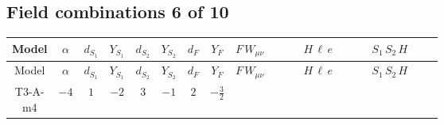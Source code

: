 \documentclass[8pt]{article}
\begin{document}
\begin{landscape}
\subsection*{Field combinations 6 of 10}
\begin{longtable}{@{}cccccccc >{\raggedright\arraybackslash}p{0.21\linewidth} >{\raggedright\arraybackslash}p{0.21\linewidth} >{\raggedright\arraybackslash}p{0.21\linewidth}@{}}
\toprule
Model & $\alpha$ & $d_{S_1}$ & $Y_{S_1}$ & $d_{S_2}$ & $Y_{S_2}$ & $d_F$ & $Y_F$ & $F\,W_{\mu\nu}$ & $H\,\ell\,e$ & $S_1\,S_2\,H$ \\
\midrule
\endfirsthead
\toprule
Model & $\alpha$ & $d_{S_1}$ & $Y_{S_1}$ & $d_{S_2}$ & $Y_{S_2}$ & $d_F$ & $Y_F$ & $F\,W_{\mu\nu}$ & $H\,\ell\,e$ & $S_1\,S_2\,H$ \\
\midrule
\endhead
T3-A-m4 & $-4$ & $1$ & $-2$ & $3$ & $-1$ & $2$ & $-\frac{3}{2}$ & \scriptsize\adjustbox{max width=\linewidth}{$\begin{gathered} -\frac{1}{2} \hbar  \log \left(\frac{\bar{\mu}^{2}}{M_F^2}\right) \left(W_{\mu _1\mu _2}^{A_1}\right){}^2\end{gathered}$} & \scriptsize\adjustbox{max width=\linewidth}{$\begin{gathered} +\frac{\hbar  \overline{y_{1,i_3,r_1}} \overline{L_{a_1,i_2}}\, P_R\, e_{i_1} H_{a_1} y_{1,i_2,r_1} Y_{e,i_3,i_1}}{4 \epsilon } \\ +\frac{3}{8} \hbar  \overline{y_{1,i_3,r_1}} \overline{L_{a_1,i_2}}\, P_R\, e_{i_1} H_{a_1} y_{1,i_2,r_1} Y_{e,i_3,i_1} \\ +\frac{\sqrt{3} \hbar  \overline{y_{2,i_3,r_1}} \overline{L_{a_1,i_2}}\, P_R\, e_{i_1} H_{a_1} y_{2,i_2,r_1} Y_{e,i_3,i_1}}{4 \epsilon }\end{gathered}$} & \scriptsize\adjustbox{max width=\linewidth}{$\begin{gathered} +\overline{\lambda_5} S_{2,j_1} {\mathcal{I}_{LLS_1S_2}}^{*}_{a_1,a_2,j_1} H_{a_1}{}^{\dagger } H_{a_2}{}^{\dagger } S_1{}^{\dagger } \\ -\frac{\hbar  \overline{y_{1,i_1,r_1}} \overline{\lambda_5} S_{2,j_1} y_{1,i_1,r_1} {\mathcal{I}_{LLS_1S_2}}^{*}_{a_1,a_2,j_1} H_{a_1}{}^{\dagger } H_{a_2}{}^{\dagger } S_1{}^{\dagger }}{\epsilon } \\ -\frac{1}{2} \hbar  \overline{y_{1,i_1,r_1}} \overline{\lambda_5} S_{2,j_1} y_{1,i_1,r_1} {\mathcal{I}_{LLS_1S_2}}^{*}_{a_1,a_2,j_1} H_{a_1}{}^{\dagger } H_{a_2}{}^{\dagger } S_1{}^{\dagger }\end{gathered}$} \\

\end{longtable}
\end{landscape}
\end{document}
